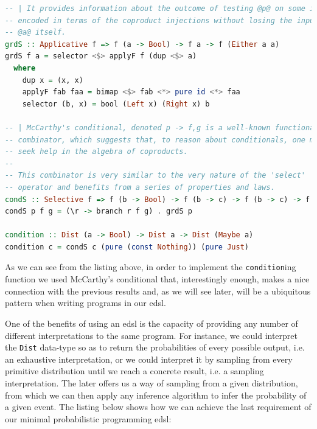 \documentclass[
  oneside,
  11pt, a4paper,
  footinclude=true,
  headinclude=true,
  cleardoublepage=empty
]{scrbook}
\theoremstyle{definition}
\theoremstyle{definition}
\begin{document}
    \begin{lstlisting}[language=Haskell, caption={Conditioning function},captionpos=b]
-- | It provides information about the outcome of testing @p@ on some input @a@,
-- encoded in terms of the coproduct injections without losing the input
-- @a@ itself.
grdS :: Applicative f => f (a -> Bool) -> f a -> f (Either a a)
grdS f a = selector <$> applyF f (dup <$> a)
  where
    dup x = (x, x)
    applyF fab faa = bimap <$> fab <*> pure id <*> faa
    selector (b, x) = bool (Left x) (Right x) b

-- | McCarthy's conditional, denoted p -> f,g is a well-known functional
-- combinator, which suggests that, to reason about conditionals, one may
-- seek help in the algebra of coproducts.
--
-- This combinator is very similar to the very nature of the 'select'
-- operator and benefits from a series of properties and laws.
condS :: Selective f => f (b -> Bool) -> f (b -> c) -> f (b -> c) -> f b -> f c
condS p f g = (\r -> branch r f g) . grdS p

condition :: Dist (a -> Bool) -> Dist a -> Dist (Maybe a)
condition c = condS c (pure (const Nothing)) (pure Just)
    \end{lstlisting}
    
    As we can see from the listing above, in order to implement the \texttt{condition}ing function we used McCarthy's conditional that, interestingly enough, makes a nice connection with the previous results and, as we will see later, will be a ubiquitous pattern when writing programs in our \gls{edsl}.
    
    One of the benefits of using an \gls{edsl} is the capacity of providing any number of different interpretations to the same program. For instance, we could interpret the \texttt{Dist} data-type so as to return the probabilities of every possible output, i.e. an exhaustive interpretation, or we could interpret it by sampling from every primitive distribution until we reach a concrete result, i.e. a sampling interpretation. The later offers us a way of sampling from a given distribution, from which we can then apply any inference algorithm to infer the probability of a given event. The listing below shows how we can achieve the last requirement of our minimal probabilistic programming \gls{edsl}:
    
\end{document}
